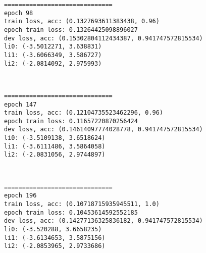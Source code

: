 \documentclass[11pt]{article}
\begin{document}
    \begin{Verbatim}[commandchars=\\\{\}]
==============================
epoch 98
train loss, acc: (0.1327693611383438, 0.96)
epoch train loss: 0.13264425098896027
dev loss, acc: (0.15302804112434387, 0.941747572815534)
li0: (-3.5012271, 3.638831)
li1: (-3.6066349, 3.586727)
li2: (-2.0814092, 2.975993)

    \end{Verbatim}

    \begin{center}
    \end{center}
    { \hspace*{\fill} \\}
    
    \begin{Verbatim}[commandchars=\\\{\}]
==============================
epoch 147
train loss, acc: (0.12104735523462296, 0.96)
epoch train loss: 0.11657220870256424
dev loss, acc: (0.14614097774028778, 0.941747572815534)
li0: (-3.5109138, 3.6518624)
li1: (-3.6111486, 3.5864058)
li2: (-2.0831056, 2.9744897)

    \end{Verbatim}

    \begin{center}
    \end{center}
    { \hspace*{\fill} \\}
    
    \begin{Verbatim}[commandchars=\\\{\}]
==============================
epoch 196
train loss, acc: (0.10718715935945511, 1.0)
epoch train loss: 0.10453614592552185
dev loss, acc: (0.14277136325836182, 0.941747572815534)
li0: (-3.520288, 3.6658235)
li1: (-3.6134653, 3.5875156)
li2: (-2.0853965, 2.9733686)

    \end{Verbatim}

    \begin{center}
    \end{center}
    { \hspace*{\fill} \\}
    
\end{document}
